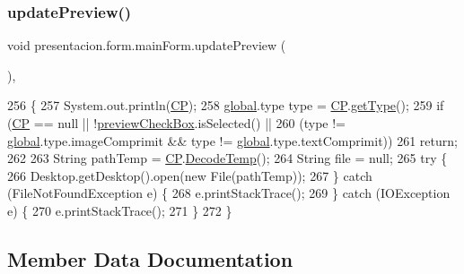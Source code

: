 \subsubsection{\texorpdfstring{update\+Preview()}{updatePreview()}}
{\footnotesize\ttfamily void presentacion.\+form.\+main\+Form.\+update\+Preview (\begin{DoxyParamCaption}{ }\end{DoxyParamCaption})\hspace{0.3cm}{\ttfamily [inline]}, {\ttfamily [private]}}


\begin{DoxyCode}
256                                  \{
257         System.out.println(\hyperlink{classpresentacion_1_1form_1_1mainForm_a4d01396f002d4f9bd18db3877057c77b}{CP});
258         \hyperlink{namespaceglobal}{global}.type type = \hyperlink{classpresentacion_1_1form_1_1mainForm_a4d01396f002d4f9bd18db3877057c77b}{CP}.\hyperlink{classpresentacion_1_1Ctrl__Presentacio_1_1Ctrl__Presentacio_a029db5d77bf1e81be0811816a74d81a0}{getType}();
259         \textcolor{keywordflow}{if} (\hyperlink{classpresentacion_1_1form_1_1mainForm_a4d01396f002d4f9bd18db3877057c77b}{CP} == null || !\hyperlink{classpresentacion_1_1form_1_1mainForm_a0dbe9873e69c0702a519d1cd171594c0}{previewCheckBox}.isSelected() ||
260                 (type != \hyperlink{namespaceglobal}{global}.type.imageComprimit && type != \hyperlink{namespaceglobal}{global}.type.textComprimit))
261             \textcolor{keywordflow}{return};
262 
263         String pathTemp = \hyperlink{classpresentacion_1_1form_1_1mainForm_a4d01396f002d4f9bd18db3877057c77b}{CP}.\hyperlink{classpresentacion_1_1Ctrl__Presentacio_1_1Ctrl__Presentacio_aa9c12bc59a7e9fa0ccd09c0e007d4a4c}{DecodeTemp}();
264         String file = null;
265         \textcolor{keywordflow}{try} \{
266             Desktop.getDesktop().open(\textcolor{keyword}{new} File(pathTemp));
267         \} \textcolor{keywordflow}{catch} (FileNotFoundException e) \{
268             e.printStackTrace();
269         \} \textcolor{keywordflow}{catch} (IOException e) \{
270             e.printStackTrace();
271         \}
272     \}
\end{DoxyCode}


\subsection{Member Data Documentation}
\mbox{\label{classpresentacion_1_1form_1_1mainForm_a957286f19a01eedc946c0f666636fb21}} 
